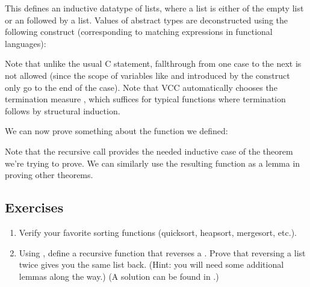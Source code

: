 
This defines an inductive datatype of lists, where a list is either of
the empty list  or an  followed by a
list. Values of abstract types are deconstructed using the following
 construct (corresponding to matching expressions in
functional languages):


Note that unlike the usual C  statement, fallthrough from
one case to the next is not allowed (since the scope of variables like
 and  introduced by the  construct only go to
the end of the case). Note that VCC automatically chooses the
termination measure , which
suffices for typical functions where termination follows by structural
induction. 

We can now prove something about the function we defined:


Note that the recursive call provides the needed inductive case of the
theorem we're trying to prove. We can similarly use the resulting
function as a lemma in proving other theorems. 


\subsection*{Exercises}
\begin{enumerate}

\item 
Verify your favorite sorting functions (quicksort, heapsort,
mergesort, etc.).
\item
Using , define a recursive function that reverses a
. Prove that reversing a list twice gives you the same list
back. (Hint: you will need some additional lemmas along the way.) (A
solution can be found in .)
\end{enumerate}
